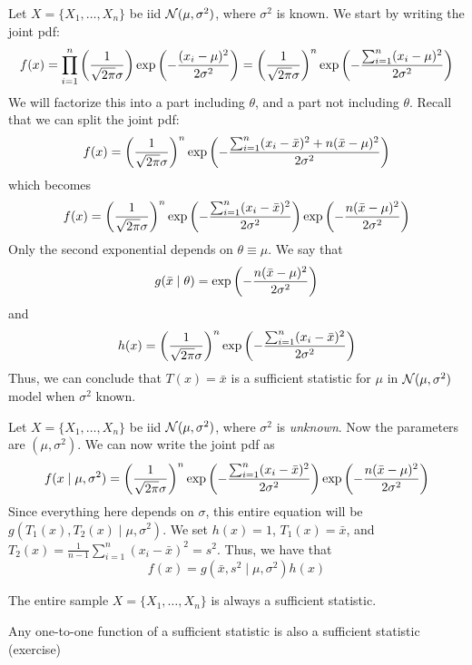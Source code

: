 \documentclass[10pt]{article}
\begin{document}
\begin{example}
	Let $X = \{X_1,\dots,X_n\}$ be iid $\mathcal{N}(\mu,\sigma^2)$, where $\sigma^2$ is known. We start by writing the joint pdf:
	\[
	f(x) = \prod_{i=1}^n \left( \frac{1}{\sqrt{2\pi} \sigma} \right) \exp\left(-\frac{(x_i - \mu)^2}{2\sigma^2} \right) = \left( \frac{1}{\sqrt{2\pi} \sigma} \right)^n \exp\left(-\frac{\sum_{i=1}^n(x_i - \mu)^2}{2\sigma^2} \right)
	\]
	We will factorize this into a part including $\theta$, and a part not including $\theta$. Recall that we can split the joint pdf:
	\[
	f(x) = \left( \frac{1}{\sqrt{2\pi} \sigma} \right)^n \exp\left(-\frac{\sum_{i=1}^n(x_i - \bar{x})^2 + n(\bar{x} - \mu)^2}{2\sigma^2} \right)
	\]
	which becomes
	\[
	f(x) = \left( \frac{1}{\sqrt{2\pi} \sigma} \right)^n \exp \left( -\frac{\sum_{i=1}^n(x_i - \bar{x})^2}{2\sigma^2} \right) \exp \left( -\frac{n(\bar{x} - \mu)^2}{2\sigma^2} \right)
	\]
	Only the second exponential depends on $\theta \equiv \mu$. We say that
	\[
	g(\bar{x} \mid \theta) = \exp \left( -\frac{n(\bar{x} - \mu)^2}{2\sigma^2} \right)
	\]
	and
	\[
	h(x) = \left( \frac{1}{\sqrt{2\pi} \sigma} \right)^n \exp \left( -\frac{\sum_{i=1}^n(x_i - \bar{x})^2}{2\sigma^2} \right)
	\]
	Thus, we can conclude that $T(x) = \bar{x}$ is a sufficient statistic for $\mu$ in $\mathcal{N}(\mu,\sigma^2)$ model when $\sigma^2$ known.
\end{example}

\begin{example}
	Let $X = \{X_1,\dots,X_n\}$ be iid $\mathcal{N}(\mu,\sigma^2)$, where $\sigma^2$ is \emph{unknown}. Now the parameters are $(\mu,\sigma^2)$. We can now write the joint pdf as
	\[
	f(x \mid \mu,\sigma^2) = \left( \frac{1}{\sqrt{2\pi} \sigma} \right)^n \exp \left( -\frac{\sum_{i=1}^n(x_i - \bar{x})^2}{2\sigma^2} \right) \exp \left( -\frac{n(\bar{x} - \mu)^2}{2\sigma^2} \right)
	\]
	Since everything here depends on $\sigma$, this entire equation will be $g(T_1(x),T_2(x) \mid \mu,\sigma^2)$. We set $h(x) = 1$, $T_1(x) = \bar{x}$, and $T_2(x) = \frac{1}{n-1}\sum_{i=1}^n (x_i - \bar{x})^2 = s^2$. Thus, we have that
	\[
	f(x) = g(\bar{x},s^2 \mid \mu,\sigma^2) h(x)
	\]
\end{example}

\begin{remark}
	The entire sample $X = \{X_1,\dots,X_n\}$ is always a sufficient statistic. 
\end{remark}

\begin{remark}
	Any one-to-one function of a sufficient statistic is also a sufficient statistic (exercise)
\end{remark}
\end{document}
